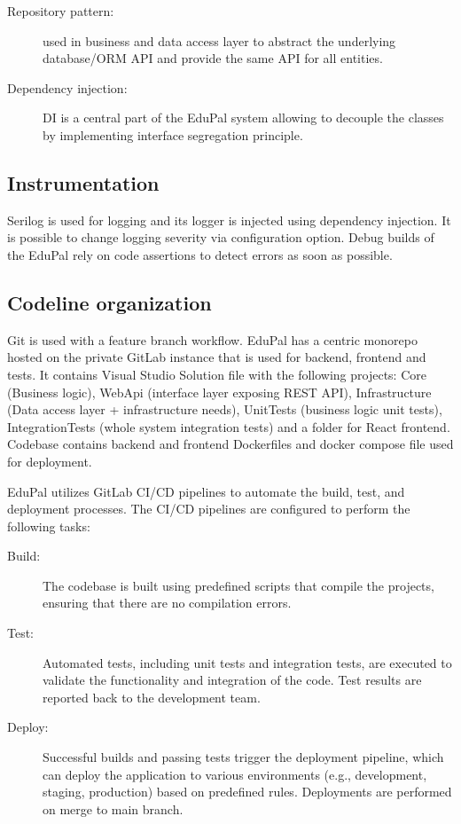 \begin{description}
  \item[Repository pattern:] used in business and data access layer to abstract the underlying database/ORM API and provide the same API for all entities.
  \item[Dependency injection:] DI is a central part of the EduPal system allowing to decouple the classes by implementing interface segregation principle.
\end{description}

\subsection{Instrumentation}

Serilog is used for logging and its logger is injected using dependency injection. It is possible to change logging severity via configuration option. Debug builds of the EduPal rely on code assertions to detect errors as soon as possible.

\subsection{Codeline organization}

Git is used with a feature branch workflow. EduPal has a centric monorepo hosted on the private GitLab instance that is used for backend, frontend and tests. It contains Visual Studio Solution file with the following projects: Core (Business logic), WebApi (interface layer exposing REST API), Infrastructure (Data access layer + infrastructure needs), UnitTests (business logic unit tests), IntegrationTests (whole system integration tests) and a folder for React frontend. Codebase contains backend and frontend Dockerfiles and docker compose file used for deployment.

EduPal utilizes GitLab CI/CD pipelines to automate the build, test, and deployment processes. The CI/CD pipelines are configured to perform the following tasks:

\begin{description}
\item[Build:] The codebase is built using predefined scripts that compile the projects, ensuring that there are no compilation errors.

\item[Test:] Automated tests, including unit tests and integration tests, are executed to validate the functionality and integration of the code. Test results are reported back to the development team.

\item[Deploy:] Successful builds and passing tests trigger the deployment pipeline, which can deploy the application to various environments (e.g., development, staging, production) based on predefined rules. Deployments are performed on merge to main branch.
\end{description}

